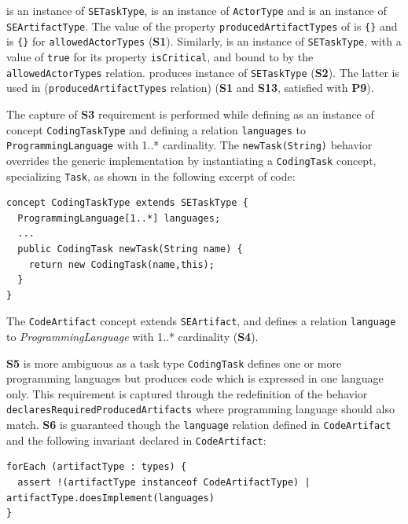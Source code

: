 
 is an instance of \texttt{SETaskType},  is an instance of \texttt{ActorType} and  is an instance of \texttt{SEArtifactType}. The value of the property \texttt{producedArtifactTypes} of  is \texttt{\{}\texttt{\}} and is \texttt{\{}\texttt{\}} for \texttt{allowedActorTypes} (\textbf{S1}). Similarly,  is an instance of \texttt{SETaskType}, with a value of \texttt{true} for its property \texttt{isCritical}, and bound to  by the \texttt{allowedActorTypes} relation.  produces  instance of \texttt{SETaskType} (\textbf{S2}). The latter is used in  (\texttt{producedArtifactTypes} relation) (\textbf{S1} and \textbf{S13}, satisfied with \textbf{P9}).

The capture of \textbf{S3} requirement is performed while defining  as an instance of concept \texttt{CodingTaskType} and defining a relation \texttt{languages} to \texttt{ProgrammingLanguage} with 1..* cardinality.
The \texttt{newTask(String)} behavior overrides the generic implementation by instantiating a \texttt{CodingTask} concept, specializing \texttt{Task}, as shown in the following excerpt of \FML code:

\begin{lstlisting}
concept CodingTaskType extends SETaskType {
  ProgrammingLanguage[1..*] languages;
  ...
  public CodingTask newTask(String name) {
    return new CodingTask(name,this);
  }
}
\end{lstlisting}

The \texttt{CodeArtifact} concept extends \texttt{SEArtifact}, and defines a relation \texttt{language} to \textit{ProgrammingLanguage} with 1..* cardinality (\textbf{S4}).

\textbf{S5} is more ambiguous as a task type \texttt{CodingTask} defines one or more programming languages but produces code which is expressed in one language only. This requirement is captured through the redefinition of the behavior \texttt{declaresRequiredProducedArtifacts} where programming language should also match.
\textbf{S6} is guaranteed though the \texttt{language} relation defined in \texttt{CodeArtifact} and the following invariant declared in \texttt{CodeArtifact}:
\begin{lstlisting}
forEach (artifactType : types) {
  assert !(artifactType instanceof CodeArtifactType) | artifactType.doesImplement(languages)
}
\end{lstlisting}

